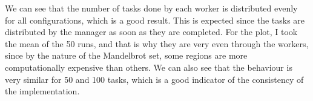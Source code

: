 \documentclass[unicode,11pt,a4paper,oneside,numbers=endperiod,openany]{scrartcl}
\begin{document}
We can see that the number of tasks done by each worker is distributed evenly
for all configurations, which is a good result. This is expected since the
tasks are distributed by the manager as soon as they are completed. For the
plot, I took the mean of the 50 runs, and that is why they are very even through
the workers, since by the nature of the Mandelbrot set, some regions are more
computationally expensive than others. We can also see that the behaviour is
very similar for 50 and 100 tasks, which is a good indicator of the consistency
of the implementation.
\end{document}
